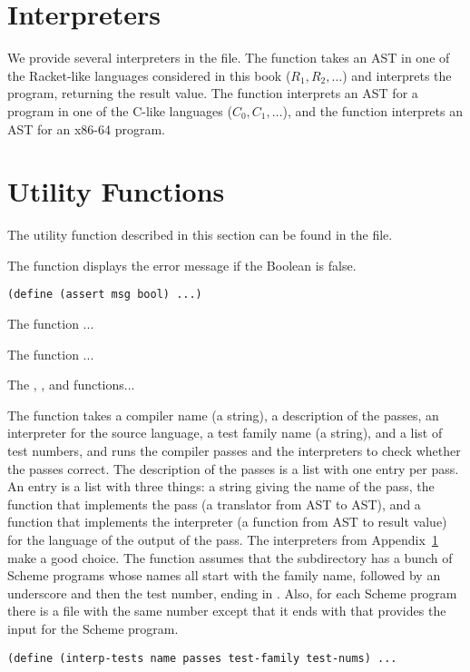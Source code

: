 \documentclass[11pt]{book}
\begin{document}
\section{Interpreters}
\label{appendix:interp}

We provide several interpreters in the  file.  The
 function takes an AST in one of the Racket-like
languages considered in this book ($R_1, R_2, \ldots$) and interprets
the program, returning the result value.  The  function
interprets an AST for a program in one of the C-like languages ($C_0,
C_1, \ldots$), and the  function interprets an AST
for an x86-64 program.

\section{Utility Functions}
\label{appendix:utilities}

The utility function described in this section can be found in the
 file.

The  function displays the error message  if the
Boolean  is false.
\begin{lstlisting}
(define (assert msg bool) ...)
\end{lstlisting}

The  function ...

The  function ...

The , , and 
functions...

The  function takes a compiler name (a string), a
description of the passes, an interpreter for the source language, a
test family name (a string), and a list of test numbers, and runs the
compiler passes and the interpreters to check whether the passes
correct. The description of the passes is a list with one entry per
pass.  An entry is a list with three things: a string giving the name
of the pass, the function that implements the pass (a translator from
AST to AST), and a function that implements the interpreter (a
function from AST to result value) for the language of the output of
the pass.  The interpreters from Appendix~\ref{appendix:interp} make a
good choice.  The  function assumes that the
subdirectory  has a bunch of Scheme programs whose names
all start with the family name, followed by an underscore and then the
test number, ending in . Also, for each Scheme program there
is a file with the same number except that it ends with  that
provides the input for the Scheme program.
\begin{lstlisting}
(define (interp-tests name passes test-family test-nums) ...
\end{lstlisting}
\end{document}
